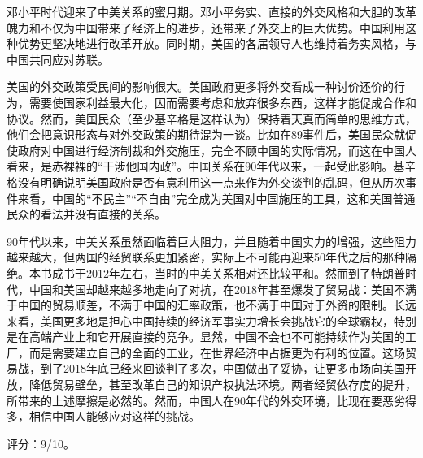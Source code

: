邓小平时代迎来了中美关系的蜜月期。邓小平务实、直接的外交风格和大胆的改革魄力和不仅为中国带来了经济上的进步，还带来了外交上的巨大优势。中国利用这种优势更坚决地进行改革开放。同时期，美国的各届领导人也维持着务实风格，与中国共同应对苏联。

美国的外交政策受民间的影响很大。美国政府更多将外交看成一种讨价还价的行为，需要使国家利益最大化，因而需要考虑和放弃很多东西，这样才能促成合作和协议。然而，美国民众（至少基辛格是这样认为）保持着天真而简单的思维方式，他们会把意识形态与对外交政策的期待混为一谈。比如在89事件后，美国民众就促使政府对中国进行经济制裁和外交施压，完全不顾中国的实际情况，而这在中国人看来，是赤裸裸的“干涉他国内政”。中国关系在90年代以来，一起受此影响。基辛格没有明确说明美国政府是否有意利用这一点来作为外交谈判的乱码，但从历次事件来看，中国的“不民主”“不自由”完全成为美国对中国施压的工具，这和美国普通民众的看法并没有直接的关系。

90年代以来，中美关系虽然面临着巨大阻力，并且随着中国实力的增强，这些阻力越来越大，但两国的经贸联系更加紧密，实际上不可能再迎来50年代之后的那种隔绝。本书成书于2012年左右，当时的中美关系相对还比较平和。然而到了特朗普时代，中国和美国却越来越多地走向了对抗，在2018年甚至爆发了贸易战：美国不满于中国的贸易顺差，不满于中国的汇率政策，也不满于中国对于外资的限制。长远来看，美国更多地是担心中国持续的经济军事实力增长会挑战它的全球霸权，特别是在高端产业上和它开展直接的竞争。显然，中国不会也不可能持续作为美国的工厂，而是需要建立自己的全面的工业，在世界经济中占据更为有利的位置。这场贸易战，到了2018年底已经来回谈判了多次，中国做出了妥协，让更多市场向美国开放，降低贸易壁垒，甚至改革自己的知识产权执法环境。两者经贸依存度的提升，所带来的上述摩擦是必然的。然而，中国人在90年代的外交环境，比现在要恶劣得多，相信中国人能够应对这样的挑战。

评分：9/10。